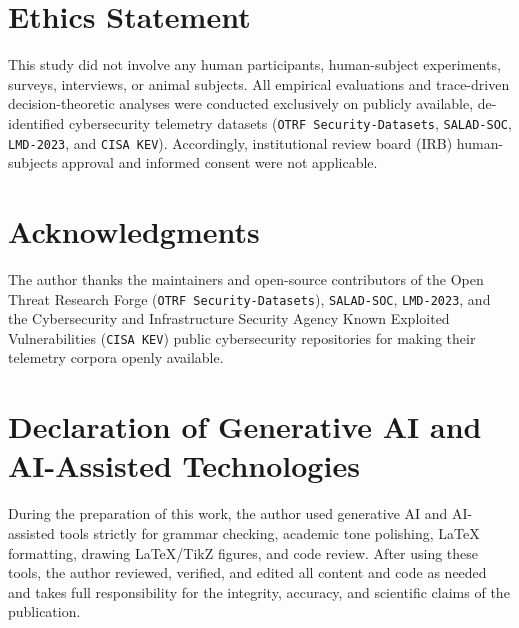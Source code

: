 \documentclass[11pt,a4paper]{article}
\begin{document}
\section*{Ethics Statement}
This study did not involve any human participants, human-subject experiments, surveys, interviews, or animal subjects. All empirical evaluations and trace-driven decision-theoretic analyses were conducted exclusively on publicly available, de-identified cybersecurity telemetry datasets (\texttt{OTRF Security-Datasets}, \texttt{SALAD-SOC}, \texttt{LMD-2023}, and \texttt{CISA KEV}). Accordingly, institutional review board (IRB) human-subjects approval and informed consent were not applicable.

\section*{Acknowledgments}
The author thanks the maintainers and open-source contributors of the Open Threat Research Forge (\texttt{OTRF Security-Datasets}), \texttt{SALAD-SOC}, \texttt{LMD-2023}, and the Cybersecurity and Infrastructure Security Agency Known Exploited Vulnerabilities (\texttt{CISA KEV}) public cybersecurity repositories for making their telemetry corpora openly available.

\section*{Declaration of Generative AI and AI-Assisted Technologies}
During the preparation of this work, the author used generative AI and AI-assisted tools strictly for grammar checking, academic tone polishing, \LaTeX{} formatting, drawing \LaTeX{}/TikZ figures, and code review. After using these tools, the author reviewed, verified, and edited all content and code as needed and takes full responsibility for the integrity, accuracy, and scientific claims of the publication.
\end{document}
